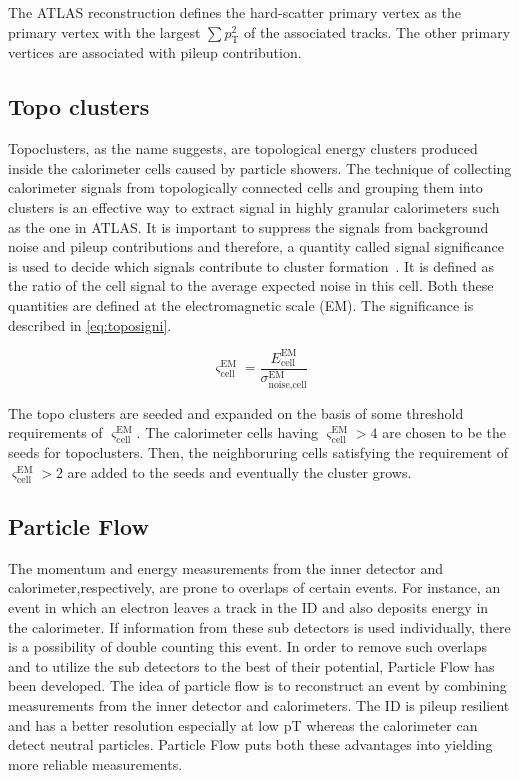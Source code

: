 The ATLAS reconstruction defines the hard-scatter primary vertex as the primary vertex with the
largest $\sum p_{\text{T}}^2$ of the associated tracks. The other primary vertices are associated
with pileup contribution. 

\subsection{Topo clusters}
Topoclusters, as the name suggests, are topological energy clusters produced inside the calorimeter cells caused by particle showers. 
The technique of collecting calorimeter signals from topologically connected cells and grouping them into clusters is an effective way to extract signal in 
highly granular calorimeters such as the one in ATLAS. It is important to suppress the signals from background noise and pileup contributions and therefore, 
a quantity called signal significance is used to decide which signals contribute to cluster formation~\cite{Aad:2138166}. It is defined as the ratio of the cell signal to the average 
expected noise in this cell. Both these quantities are defined at the electromagnetic scale (EM). The significance is described in \cref{eq:toposigni}.

\begin{equation}
    \varsigma_{\text{cell}}^{\text{EM}} = \frac{E_{\text{cell}}^{\text{EM}}}{\sigma_{\text{noise,cell}}^{\text{EM}}}
    \label{eq:toposigni}
\end{equation}

The topo clusters are seeded and expanded on the basis of some threshold requirements of $\varsigma_{\text{cell}}^{\text{EM}}$. 
The calorimeter cells having $\varsigma_{\text{cell}}^{\text{EM}}>4$ are chosen to be the seeds for topoclusters. Then, the 
neighboruring cells satisfying the requirement of $\varsigma_{\text{cell}}^{\text{EM}}>2$ are added to the seeds and eventually the
cluster grows.

\subsection{Particle Flow}
\label{sec:pflow}
The momentum and energy measurements from the inner detector and calorimeter,respectively, are prone
to overlaps of certain events. For instance, an event in which an electron leaves a track in the ID and also
deposits energy in the calorimeter. If information from these sub detectors is used individually, there is a
possibility of double counting this event. In order to remove such overlaps and to utilize the sub detectors to
the best of their potential, Particle Flow has been developed. The idea of particle flow is to reconstruct an
event by combining measurements from the inner detector and calorimeters. The ID is pileup resilient and
has a better resolution especially at low pT whereas the calorimeter can detect neutral particles. Particle
Flow puts both these advantages into yielding more reliable measurements.

